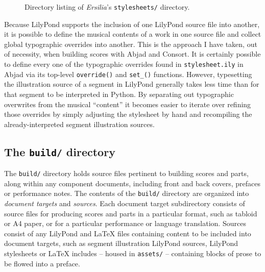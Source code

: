 \begin{figure}[h!]
\begin{singlespacing}
\vspace{-0.5\baselineskip}
\end{singlespacing}
\caption{
Directory listing of \emph{Ersilia}'s \texttt{stylesheets/} directory.
}
\end{figure}

Because LilyPond supports the inclusion of one LilyPond source file into
another, it is possible to define the musical contents of a work in one source
file and collect global typographic overrides into another. This is the
approach I have taken, out of necessity, when building scores with Abjad and
Consort. It is certainly possible to define every one of the typographic
overrides found in \texttt{stylesheet.ily} in Abjad via its top-level
\texttt{override()} and \texttt{set\_()} functions. However, typesetting the
illustration source of a segment in LilyPond generally takes less time than for
that segment to be interpreted in Python. By separating out typographic
overwrites from the musical \enquote{content} it becomes easier to iterate over
refining those overrides by simply adjusting the stylesheet by hand and
recompiling the already-interpreted segment illustration sources.

\subsection{The \texttt{build/} directory}
\label{ssec:the-build-directory}

The \texttt{build/} directory holds source files pertinent to building scores
and parts, along within any component documents, including front and back
covers, prefaces or performance notes. The contents of the \texttt{build/}
directory are organized into \emph{document targets} and \emph{sources}. Each
document target subdirectory consists of source files for producing scores and
parts in a particular format, such as tabloid or A4 paper, or for a particular
performance or language translation. Sources consist of any LilyPond and LaTeX
files containing content to be included into document targets, such as segment
illustration LilyPond sources, LilyPond stylesheets or LaTeX includes -- housed
in \texttt{assets/} -- containing blocks of prose to be flowed into a preface.

